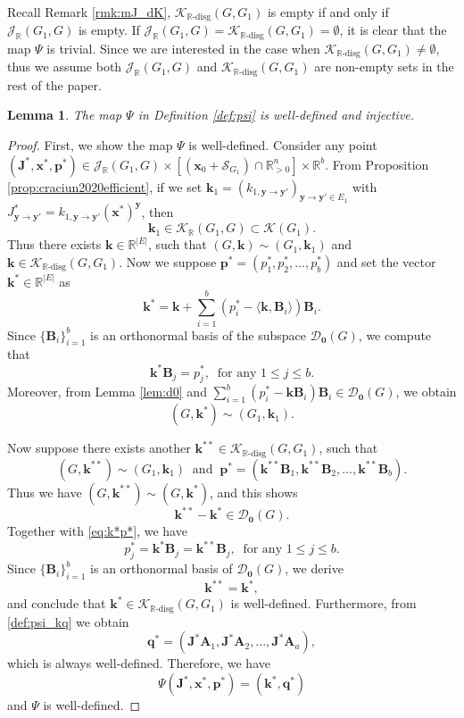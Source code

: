 \documentclass[11pt]{article}
\theoremstyle{plain}
\newtheorem{lemma}[theorem]{Lemma}
\theoremstyle{definition}
\theoremstyle{remark}
\newcommand\RR{\mathbb{R}}
\newcommand\by{\boldsymbol{y}}
\newcommand\bk{\boldsymbol{k}}
\newcommand\bx{\boldsymbol{x}}
\newcommand\bA{\boldsymbol{A}}
\newcommand\bB{\boldsymbol{B}}
\newcommand\bq{\boldsymbol{q}}
\newcommand\bp{\boldsymbol{p}}
\newcommand\bJ{\boldsymbol{J}}
\newcommand{\mK}{\mathcal{K}}
\newcommand{\dK}{\mathcal{K}_{\RR\text{-disg}}}
\newcommand{\mJ}{\mathcal{J}_{\RR}}
\newcommand{\mD}{\mathcal{D}_{\textbf{0}}}
\newcommand{\mS}{\mathcal{S}}
\begin{document}
Recall Remark \ref{rmk:mJ_dK}, $\dK (G, G_1)$ is empty if and only if $\mJ(G_1, G)$ is empty. 
If $\mJ(G_1, G) = \dK (G, G_1) = \emptyset$, it is clear that the map $\Psi$ is trivial.
Since we are interested in the case when $\dK (G, G_1) \neq \emptyset$, thus we assume both $\mJ(G_1, G)$ and $\dK (G, G_1)$ are non-empty sets in the rest of the paper.

\begin{lemma}
\label{lem:psi_injective}
The map $\Psi$ in Definition \ref{def:psi}
is well-defined and injective.
\end{lemma}

\begin{proof}
First, we show the map $\Psi$ is well-defined. Consider any  point $(\bJ^*, \bx^*, \bp^*) \in \mJ(G_1,G)\times [(\bx_0 + \mS_{G_1} )\cap\mathbb{R}^n_{>0}] \times \mathbb{R}^b$.
From Proposition \ref{prop:craciun2020efficient}, if we set
$\bk_1 = (k_{1, \by\rightarrow \by'})_{\by\rightarrow \by' \in E_1}$
with
$J^*_{\by \rightarrow \by'} = k_{1, \by\rightarrow \by'} (\bx^*)^{\by}$, then 
\[
\bk_1 \in \mK_{\RR} (G_1,G) \subset \mK(G_1).
\]
Thus there exists $\bk \in \RR^{|E|}$, such that
$(G, \bk) \sim (G_1, \bk_1)$ and $\bk \in \dK(G,G_1)$.
Now we suppose $\bp^* = (p^*_1, p^*_2, \ldots, p^*_b)$ and set the vector $\bk^* \in \RR^{|E|}$ as 
\[
\bk^* = \bk + \sum\limits^{b}_{i=1} (p^*_i - \langle \bk, \bB_i \rangle ) \bB_i.
\]
Since $\{ \bB_i \}^b_{i=1}$ is an orthonormal basis of the subspace $\mD(G)$, we compute that
\begin{equation} \label{eq:k*p*}
\bk^* \bB_j = p^*_j,
\ \text{ for any }
1 \leq j \leq b.
\end{equation}
Moreover, from Lemma \ref{lem:d0} and
$\sum\limits^{b}_{i=1} (p^*_i - \bk \bB_i ) \bB_i \in \mD(G)$, we obtain
\[
(G, \bk^*) \sim (G_1, \bk_1).
\]

Now suppose there exists another $\bk^{**} \in \dK(G,G_1)$, such that
\[(G, \bk^{**}) \sim (G_1, \bk_1)
\ \text{ and } \
\bp^* = (\bk^{**} \bB_1, \bk^{**} \bB_2, \ldots, \bk^{**} \bB_b).
\]
Thus we have $(G, \bk^{**}) \sim (G, \bk^*)$, and this shows 
\[
\bk^{**} - \bk^{*} \in \mD(G).
\]
Together with \eqref{eq:k*p*}, we have
\[
p^*_j = \bk^* \bB_j = \bk^{**} \bB_j,
\ \text{ for any }
1 \leq j \leq b.
\]
Since $\{ \bB_i \}^b_{i=1}$ is an orthonormal basis of $\mD(G)$, we derive \[\bk^{**} = \bk^{*},\] 
and conclude that $\bk^* \in \dK(G,G_1)$ is well-defined.
Furthermore, from \eqref{def:psi_kq} we obtain 
\[
\bq^* = (\bJ^* \bA_1,\bJ^* \bA_2 ,..., \bJ^* \bA_a),
\] which is always well-defined.
Therefore, we have
\[
\Psi (\bJ^*, \bx^*, \bp^*) = (\bk^*, \bq^*)
\]
and $\Psi$ is well-defined.


\end{proof}
\end{document}

